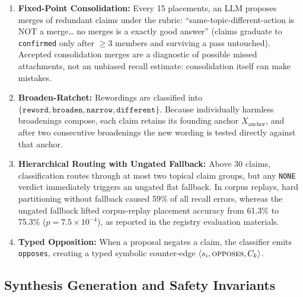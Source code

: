 \documentclass[11pt,a4paper]{article}
\begin{document}
\begin{enumerate}
\item \textbf{Fixed-Point Consolidation:} Every 15 placements, an LLM proposes merges of redundant claims under the rubric: ``same-topic-different-action is NOT a merge\ldots{} no merges is a exactly good answer'' (claims graduate to \texttt{confirmed} only after $\geq 3$ members and surviving a pass untouched). Accepted consolidation merges are a diagnostic of possible missed attachments, not an unbiased recall estimate: consolidation itself can make mistakes.
\item \textbf{Broaden-Ratchet:} Rewordings are classified into $\{\texttt{reword}, \texttt{broaden}, \texttt{narrow}, \texttt{different}\}$. Because individually harmless broadenings compose, each claim retains its founding anchor $X_{\mathrm{anchor}}$, and after two consecutive broadenings the new wording is tested directly against that anchor.
\item \textbf{Hierarchical Routing with Ungated Fallback:} Above 30 claims, classification routes through at most two topical claim groups, but any \texttt{NONE} verdict immediately triggers an ungated flat fallback. In corpus replays, hard partitioning without fallback caused 59\% of all recall errors, whereas the ungated fallback lifted corpus-replay placement accuracy from 61.3\% to 75.3\% ($p = 7.5 \times 10^{-4}$), as reported in the registry evaluation materials.
\item \textbf{Typed Opposition:} When a proposal negates a claim, the classifier emits \texttt{opposes}, creating a typed symbolic counter-edge $\langle s_i, \textsc{opposes}, C_k \rangle$.
\end{enumerate}

\subsection{Synthesis Generation and Safety Invariants}
\end{document}
